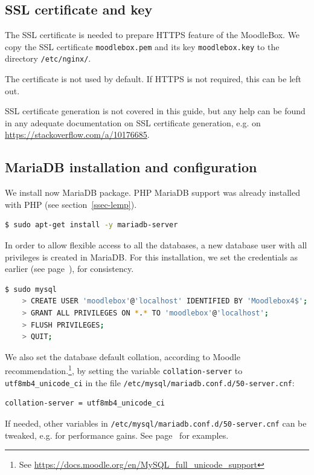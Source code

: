 \documentclass[12pt]{article}
\begin{document}
\subsection{SSL certificate and key}

The SSL certificate is needed to prepare HTTPS feature of the MoodleBox.
We copy the SSL certificate \lstinline{moodlebox.pem} and its key \lstinline{moodlebox.key} to the directory \lstinline{/etc/nginx/}.

The certificate is not used by default.
If HTTPS is not required, this can be left out.

SSL certificate generation is not covered in this guide, but any help can be
found in any adequate documentation on SSL certificate generation, e.g. on \url{https://stackoverflow.com/a/10176685}.

\subsection{MariaDB installation and configuration}\label{ssec-mariadb}

We install now MariaDB package.
PHP MariaDB support was already installed with PHP (see section~\ref{ssec-lemp}).
\begin{lstlisting}[language=bash]
$ sudo apt-get install -y mariadb-server
\end{lstlisting}

In order to allow flexible access to all the databases, a new database user with all privileges is created in MariaDB.
For this installation, we set the credentials as earlier (see page~\pageref{ssec-new-account}), for consistency.

\begin{lstlisting}[language=bash]
$ sudo mysql
    > CREATE USER 'moodlebox'@'localhost' IDENTIFIED BY 'Moodlebox4$';
    > GRANT ALL PRIVILEGES ON *.* TO 'moodlebox'@'localhost';
    > FLUSH PRIVILEGES;
    > QUIT;
\end{lstlisting}
We also set the database default collation, according to Moodle recommendation.\footnote{See \url{https://docs.moodle.org/en/MySQL_full_unicode_support}}, by setting the variable \lstinline{collation-server} to \lstinline{utf8mb4_unicode_ci} in the file \lstinline{/etc/mysql/mariadb.conf.d/50-server.cnf}:
\begin{lstlisting}[language=bash]
collation-server = utf8mb4_unicode_ci
\end{lstlisting}
If needed, other variables in \lstinline{/etc/mysql/mariadb.conf.d/50-server.cnf} can be tweaked, e.g. for performance gains. See page~\pageref{ssec-mariadb-optimisation} for examples.
\end{document}
